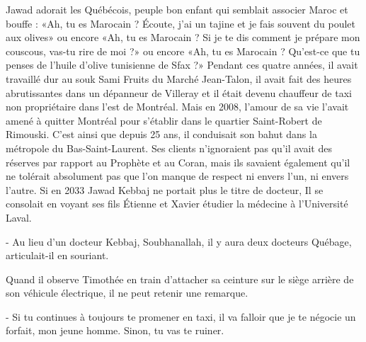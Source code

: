 
Jawad adorait les Québécois, peuple bon enfant qui semblait associer Maroc et bouffe : «Ah, tu es Marocain ? Écoute, j’ai un tajine et je fais souvent du poulet aux olives» ou encore «Ah, tu es Marocain ? Si je te dis comment je prépare mon couscous, vas-tu rire de moi ?» ou encore «Ah, tu es Marocain ? Qu’est-ce que tu penses de l’huile d’olive tunisienne de Sfax ?» Pendant ces quatre années, il avait travaillé dur au souk Sami Fruits du Marché Jean-Talon, il avait fait des heures abrutissantes dans un dépanneur de Villeray et il était devenu chauffeur de taxi non propriétaire dans l’est de Montréal. Mais en 2008, l’amour de sa vie l’avait amené à quitter Montréal pour s’établir dans le quartier Saint-Robert de Rimouski. C’est ainsi que depuis 25 ans, il conduisait son bahut dans la métropole du Bas-Saint-Laurent. Ses clients n’ignoraient pas qu’il avait des réserves par rapport au Prophète et au Coran, mais ils savaient également qu’il ne tolérait absolument pas que l’on manque de respect ni envers l’un, ni envers l’autre. Si en 2033 Jawad Kebbaj ne portait plus le titre de docteur, Il se consolait en voyant ses fils Étienne et Xavier étudier la médecine à l’Université Laval.

- Au lieu d’un docteur Kebbaj, Soubhanallah, il y aura deux docteurs Québage, articulait-il en souriant.

Quand il observe Timothée en train d’attacher sa ceinture sur le siège arrière de son véhicule électrique, il ne peut retenir une remarque.

- Si tu continues à toujours te promener en taxi, il va falloir que je te négocie un forfait, mon jeune homme. Sinon, tu vas te ruiner.

